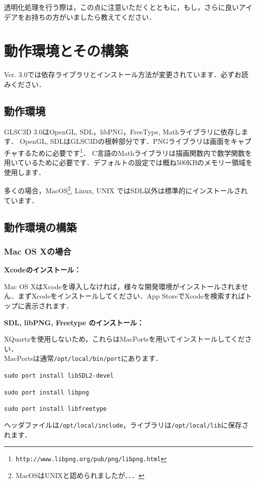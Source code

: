 \documentclass[platex,a4paper,12pt]{jsarticle}%
\begin{document}
透明化処理を行う際は，この点に注意いただくとともに，もし，さらに良いアイデアをお持ちの方がいましたら教えてください．

\newpage
\section{動作環境とその構築}
Ver. 3.0では依存ライブラリとインストール方法が変更されています．必ずお読みください．

\subsection{動作環境}

GLSC3D 3.0はOpenGL, SDL，libPNG，FreeType, Mathライブラリに依存します．
OpenGL, SDLはGLSC3Dの根幹部分です．PNGライブラリは画面をキャプチャするために必要です\footnote{\verb|http://www.libpng.org/pub/png/libpng.html|}．
C言語のMathライブラリは描画関数内で数学関数を用いているために必要です．デフォルトの設定では概ね500KBのメモリー領域を使用します．

多くの場合，MacOS\footnote{MacOSはUNIXと認められましたが．．．}, Linux, UNIX ではSDL以外は標準的にインストールされています．

\subsection{動作環境の構築}

\subsubsection{Mac OS Xの場合}

{\bf Xcodeのインストール：}

Mac OS XはXcodeを導入しなければ，様々な開発環境がインストールされません．まずXcodeをインストールしてください．App StoreでXcodeを検索すればトップに表示されます．

{\bf SDL, libPNG, Freetype のインストール：}

XQuartzを使用しないため，これらはMacPortsを用いてインストールしてください．\\MacPortsは通常\verb|/opt/local/bin/port|にあります．

\verb|sudo port install libSDL2-devel|

\verb|sudo port install libpng|

\verb|sudo port install libfreetype|

ヘッダファイルは\verb|/opt/local/include|，ライブラリは\verb|/opt/local/lib|に保存されます．
\end{document}
